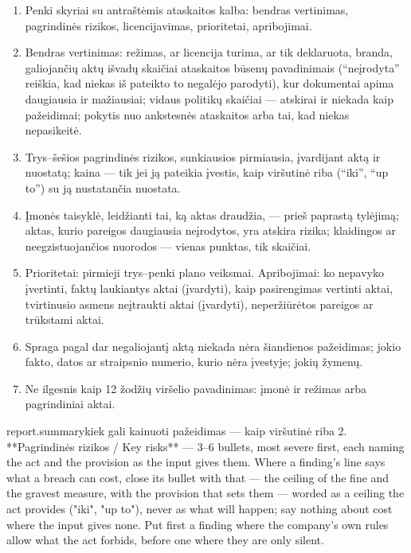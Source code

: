 \begin{enumerate}[itemsep=1pt, topsep=3pt]
  \item Penki skyriai su antraštėmis ataskaitos kalba: bendras vertinimas, pagrindinės rizikos,
    licencijavimas, prioritetai, apribojimai.
  \item Bendras vertinimas: režimas, ar licencija turima, ar tik deklaruota, branda, galiojančių
    aktų išvadų skaičiai ataskaitos būsenų pavadinimais (\enquote{neįrodyta} reiškia, kad niekas
    iš pateikto to negalėjo parodyti), kur dokumentai apima daugiausia ir mažiausiai; vidaus
    politikų skaičiai --- atskirai ir niekada kaip pažeidimai; pokytis nuo ankstesnės ataskaitos
    arba tai, kad niekas nepasikeitė.
  \item Trys--šešios pagrindinės rizikos, sunkiausios pirmiausia, įvardijant aktą ir nuostatą;
    kaina --- tik jei ją pateikia įvestis, kaip viršutinė riba (\enquote{iki}, \enquote{up to})
    su ją nustatančia nuostata.
  \item Įmonės taisyklė, leidžianti tai, ką aktas draudžia, --- prieš paprastą tylėjimą; aktas,
    kurio pareigos daugiausia neįrodytos, yra atskira rizika; klaidingos ar neegzistuojančios
    nuorodos --- vienas punktas, tik skaičiai.
  \item Prioritetai: pirmieji trys--penki plano veiksmai. Apribojimai: ko nepavyko įvertinti,
    faktų laukiantys aktai (įvardyti), kaip pasirengimas vertinti aktai, tvirtinusio asmens
    neįtraukti aktai (įvardyti), neperžiūrėtos pareigos ar trūkstami aktai.
  \item Spraga pagal dar negaliojantį aktą niekada nėra šiandienos pažeidimas; jokio fakto,
    datos ar straipsnio numerio, kurio nėra įvestyje; jokių žymenų.
  \item Ne ilgesnis kaip 12 žodžių viršelio pavadinimas: įmonė ir režimas arba pagrindiniai
    aktai.
\end{enumerate}

\par\nopagebreak
\begin{promptexcerpt}{report.summary}{kiek gali kainuoti pažeidimas --- kaip viršutinė riba}
2. **Pagrindinės rizikos / Key risks** — 3–6 bullets, most severe first, each naming
   the act and the provision as the input gives them. Where a finding's line says
   what a breach can cost, close its bullet with that — the ceiling of the fine and
   the gravest measure, with the provision that sets them — worded as a ceiling the
   act provides ("iki", "up to"), never as what will happen; say nothing about cost
   where the input gives none. Put first a finding where the
   company's own rules allow what the act forbids, before one where they are only
   silent.
\end{promptexcerpt}

